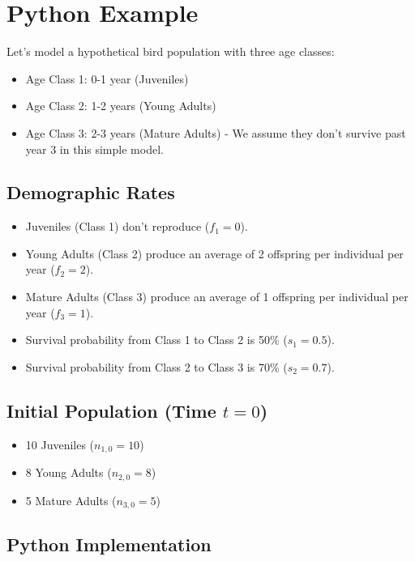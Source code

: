 \documentclass{article}
\begin{document}
\section{Python Example}

Let's model a hypothetical bird population with three age classes:
\begin{itemize}
    \item Age Class 1: 0-1 year (Juveniles)
    \item Age Class 2: 1-2 years (Young Adults)
    \item Age Class 3: 2-3 years (Mature Adults) - We assume they don't survive past year 3 in this simple model.
\end{itemize}

\subsection{Demographic Rates}
\begin{itemize}
    \item Juveniles (Class 1) don't reproduce ($f_1 = 0$).
    \item Young Adults (Class 2) produce an average of 2 offspring per individual per year ($f_2 = 2$).
    \item Mature Adults (Class 3) produce an average of 1 offspring per individual per year ($f_3 = 1$).
    \item Survival probability from Class 1 to Class 2 is 50\% ($s_1 = 0.5$).
    \item Survival probability from Class 2 to Class 3 is 70\% ($s_2 = 0.7$).
\end{itemize}

\subsection{Initial Population (Time $t=0$)}
\begin{itemize}
    \item 10 Juveniles ($n_{1,0} = 10$)
    \item 8 Young Adults ($n_{2,0} = 8$)
    \item 5 Mature Adults ($n_{3,0} = 5$)
\end{itemize}




\subsection{Python Implementation}
\end{document}

